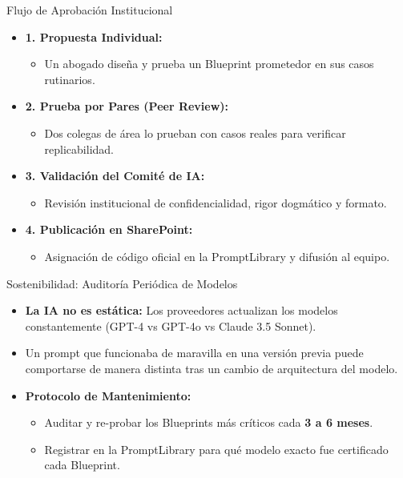 \documentclass[aspectratio=169]{beamer}
\begin{document}
\begin{frame}{Flujo de Aprobación Institucional}

\begin{itemize}
  \item \textbf{1. Propuesta Individual:}
  \begin{itemize}
    \item Un abogado diseña y prueba un Blueprint prometedor en sus casos rutinarios.
  \end{itemize}
  \item \textbf{2. Prueba por Pares (Peer Review):}
  \begin{itemize}
    \item Dos colegas de área lo prueban con casos reales para verificar replicabilidad.
  \end{itemize}
  \item \textbf{3. Validación del Comité de IA:}
  \begin{itemize}
    \item Revisión institucional de confidencialidad, rigor dogmático y formato.
  \end{itemize}
  \item \textbf{4. Publicación en SharePoint:}
  \begin{itemize}
    \item Asignación de código oficial en la PromptLibrary y difusión al equipo.
  \end{itemize}
\end{itemize}
\end{frame}

\begin{frame}{Sostenibilidad: Auditoría Periódica de Modelos}

\begin{itemize}
  \item \textbf{La IA no es estática:} Los proveedores actualizan los modelos constantemente (GPT-4 vs GPT-4o vs Claude 3.5 Sonnet).
  \item Un prompt que funcionaba de maravilla en una versión previa puede comportarse de manera distinta tras un cambio de arquitectura del modelo.
  \item \textbf{Protocolo de Mantenimiento:}
  \begin{itemize}
    \item Auditar y re-probar los Blueprints más críticos cada \textbf{3 a 6 meses}.
    \item Registrar en la PromptLibrary para qué modelo exacto fue certificado cada Blueprint.
  \end{itemize}
\end{itemize}
\end{frame}
\end{document}
